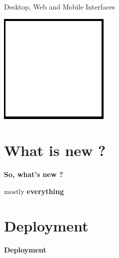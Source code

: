 \documentclass[12pt]{beamer}
\begin{document}
\begin{frame}{Desktop, Web and Mobile Interfaces}
	\begin{center}
		\includegraphics[keepaspectratio=true,height=0.5\textheight]{images/image.png}
	\end{center}
\end{frame}


\section{What is new ?}
\begin{frame}
	\begin{center}
		\LARGE\textbf{So, what's new ?}	
	\end{center}
\end{frame}

\begin{frame}
	\begin{center}
		mostly \textbf{everything}
	\end{center}
\end{frame}


\section{Deployment}
\begin{frame}
	\begin{center}
		\LARGE\textbf{Deployment}	
	\end{center}
\end{frame}
\end{document}

